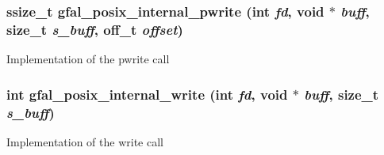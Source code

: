 \subsubsection{\setlength{\rightskip}{0pt plus 5cm}ssize\_\-t gfal\_\-posix\_\-internal\_\-pwrite (int {\em fd}, void $\ast$ {\em buff}, size\_\-t {\em s\_\-buff}, off\_\-t {\em offset})}\label{gfal__posix__write_8c_eda9f322f611299fdefc253488a26f35}


Implementation of the pwrite call 
\subsubsection{\setlength{\rightskip}{0pt plus 5cm}int gfal\_\-posix\_\-internal\_\-write (int {\em fd}, void $\ast$ {\em buff}, size\_\-t {\em s\_\-buff})}\label{gfal__posix__write_8c_fccb68462e2f770a8691d2358f2b75b6}


Implementation of the write call 